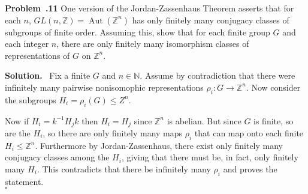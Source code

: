 \documentclass[12pt]{article}
\newcommand*{\Z}{
\mathbb{Z}
}
\newcommand*{\N}{
\mathbb{N}
}
\DeclareMathOperator{\Aut}{Aut}
\newenvironment{prob}[1]{\par\smallskip
	\noindent\begin{mdframed}\small \textbf{Problem~\thesection.#1} \rmfamily\quad}{\end{mdframed}\medskip}
\newenvironment{sol}{\noindent \textbf{Solution.} \,}{\\\hspace*{\fill}$\square$\medskip}
\begin{document}
\begin{prob}{11}
	One version of the Jordan-Zassenhaus Theorem asserts that for each $n$, $GL(n,\Z)=\Aut(\Z^n)$ has only finitely many conjugacy classes of subgroups of finite order. Assuming this, show that for each finite group $G$ and each integer $n$, there are only finitely many isomorphism classes of representations of $G$ on $\Z^n$.
\end{prob}
\begin{sol}
	Fix a finite $G$ and $n\in\N$. Assume by contradiction that there were infinitely many pairwise nonisomophic representations $\rho_i:G\to\Z^n$. Now consider the subgroups $H_i=\rho_i(G)\le Z^n$.
	
	Now if $H_i=k^{-1}H_jk$ then $H_i=H_j$ since $\Z^n$ is abelian. But since $G$ is finite, so are the $H_i$, so there are only finitely many maps $\rho_i$ that can map onto each finite $H_i\le \Z^n$. Furthermore by Jordan-Zassenhaus, there exist only finitely many conjugacy classes among the $H_i$, giving that there must be, in fact, only finitely many $H_i$. This contradicts that there be infinitely many $\rho_i$ and proves the statement. 
\end{sol}
\end{document}
